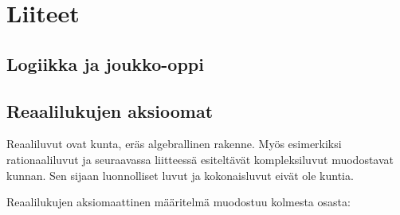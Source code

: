 \part{Liiteet}
\chapter{Logiikka ja joukko-oppi}
\chapter{Reaalilukujen aksioomat}
Reaaliluvut ovat kunta, eräs algebrallinen rakenne. Myös esimerkiksi rationaaliluvut ja seuraavassa liitteessä esiteltävät kompleksiluvut muodostavat kunnan. Sen sijaan luonnolliset luvut ja kokonaisluvut eivät ole kuntia.

Reaalilukujen aksiomaattinen määritelmä muodostuu kolmesta osasta:


